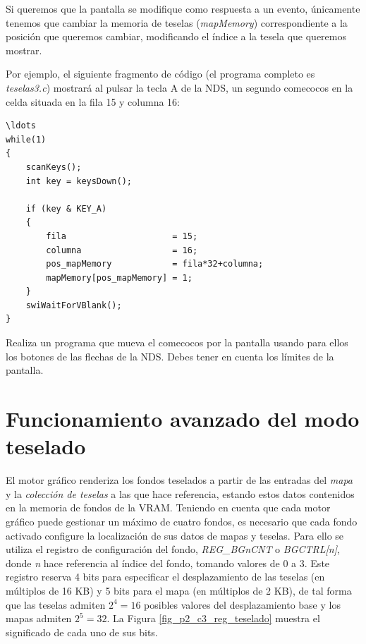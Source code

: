 Si queremos que la pantalla se modifique como respuesta a un evento, únicamente tenemos que cambiar la memoria de teselas (\textit{mapMemory}) correspondiente a la posición que queremos cambiar, modificando el índice a la tesela que queremos mostrar.

\begin{example}
Por ejemplo, el siguiente fragmento de código (el programa completo es \textit{teselas3.c}) mostrará al pulsar la tecla A de la NDS, un segundo comecocos en la celda situada en la fila 15 y columna 16:

\begin{lstlisting}
\ldots
while(1)
{
	scanKeys();
	int key = keysDown();

	if (key & KEY_A)
	{
		fila                     = 15;
		columna                  = 16;
		pos_mapMemory            = fila*32+columna;
		mapMemory[pos_mapMemory] = 1;
	}
	swiWaitForVBlank();
}
\end{lstlisting}
\end{example}

\begin{exercise}
	Realiza un programa que mueva el comecocos por la pantalla usando para ellos los botones de las flechas de la NDS. Debes tener en cuenta los límites de la pantalla.
\end{exercise}
	
	
\section{Funcionamiento avanzado del modo teselado}
El motor gráfico renderiza los fondos teselados a partir de las entradas del \textit{mapa} y la \textit{colección de teselas} a las que hace referencia, estando estos datos contenidos en la memoria de fondos de la VRAM. Teniendo en cuenta que cada motor gráfico puede gestionar un máximo de cuatro fondos, es necesario que cada fondo activado configure la localización de sus datos de mapas y teselas. Para ello se utiliza el registro de configuración del fondo, \textit{REG\_BGnCNT} o \textit{BGCTRL[n]}, donde \textit{n} hace referencia al índice del fondo, tomando valores de 0 a 3. Este registro reserva 4 bits para especificar el desplazamiento de las teselas (en múltiplos de 16 KB) y 5 bits para el mapa (en múltiplos de 2 KB), de tal forma que las teselas admiten $2^4 = 16$ posibles valores del desplazamiento base y los mapas admiten $2^5 = 32$. La Figura \ref{fig_p2_c3_reg_teselado} muestra el significado de cada uno de sus bits.

